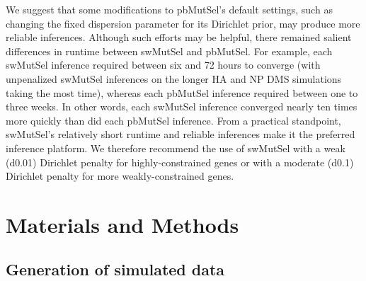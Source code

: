 \documentclass[11pt]{article}
\begin{document}
We suggest that some modifications to pbMutSel's default settings, such as changing the fixed dispersion parameter for its Dirichlet prior, may produce more reliable inferences. Although such efforts may be helpful, there remained salient differences in runtime between swMutSel and pbMutSel. For example, each swMutSel inference required between six and 72 hours to converge (with unpenalized swMutSel inferences on the longer HA and NP DMS simulations taking the most time), whereas each pbMutSel inference required between one to three weeks. In other words, each swMutSel inference converged nearly ten times more quickly than did each pbMutSel inference. From a practical standpoint, swMutSel's relatively short runtime and reliable inferences make it the preferred inference platform. We therefore recommend the use of swMutSel with a weak (d0.01) Dirichlet penalty for highly-constrained genes or with a moderate (d0.1) Dirichlet penalty for more weakly-constrained genes.




\section*{Materials and Methods}

\subsection*{Generation of simulated data}
\end{document}
